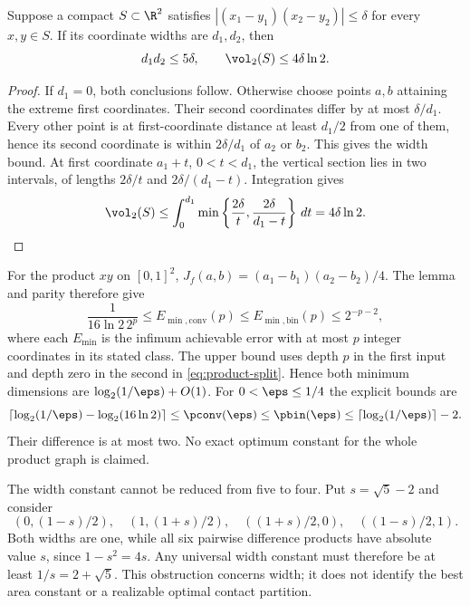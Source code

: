\begin{lemma}\label{lem:product-width}
Suppose a compact $S\subset\R^2$ satisfies
$|(x_1-y_1)(x_2-y_2)|\le\delta$ for every $x,y\in S$.
If its coordinate widths are $d_1,d_2$, then
\[
 d_1d_2\le5\delta,\qquad \vol_2(S)\le4\delta\ln2.
\]
\end{lemma}
\begin{proof}
If $d_1=0$, both conclusions follow. Otherwise choose points $a,b$
attaining the extreme first coordinates. Their second coordinates differ
by at most $\delta/d_1$. Every other point is at first-coordinate
distance at least $d_1/2$ from one of them, hence its second coordinate
is within $2\delta/d_1$ of $a_2$ or $b_2$. This gives the width bound.
At first coordinate $a_1+t$, $0<t<d_1$, the vertical section lies in
two intervals, of lengths $2\delta/t$ and $2\delta/(d_1-t)$.
Integration gives
\[
 \vol_2(S)\le
 \int_0^{d_1}\min\left\{\frac{2\delta}{t},
                    \frac{2\delta}{d_1-t}\right\}\,dt
 =4\delta\ln2.
\]
\end{proof}

For the product $xy$ on $[0,1]^2$, $J_f(a,b)=(a_1-b_1)(a_2-b_2)/4$.
The lemma and parity therefore give
\begin{equation}\label{eq:product-finite}
 \frac{1}{16\ln2\,2^p}\le E_{
\min,\mathrm{conv}}(p)\le E_{\min,\mathrm{bin}}(p)\le2^{-p-2},
\end{equation}
where each $E_{\min}$ is the infimum achievable error with at most $p$
integer coordinates in its stated class. The upper bound uses depth
$p$ in the first input and depth zero in the second in
\eqref{eq:product-split}. Hence both minimum dimensions are
$\log_2(1/\eps)+O(1)$. For $0<\eps\le1/4$ the explicit bounds are
\[
 \left\lceil\log_2(1/\eps)-\log_2(16\ln2)\right\rceil
 \le\pconv(\eps)\le\pbin(\eps)
 \le\lceil\log_2(1/\eps)\rceil-2.
\]
Their difference is at most two. No exact optimum constant for the
whole product graph is claimed.

The width constant cannot be reduced from five to four. Put
$s=\sqrt5-2$ and consider
\[
 (0,(1-s)/2),\quad (1,(1+s)/2),\quad
 ((1+s)/2,0),\quad ((1-s)/2,1).
\]
Both widths are one, while all six pairwise difference products have
absolute value $s$, since $1-s^2=4s$. Any universal width constant must
therefore be at least $1/s=2+\sqrt5$. This obstruction concerns width;
it does not identify the best area constant or a realizable optimal
contact partition.

